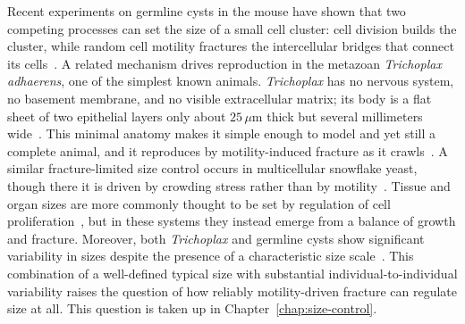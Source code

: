 Recent experiments on germline cysts in the mouse have shown that two competing processes can set the size of a small cell cluster: cell division builds the cluster, while random cell motility fractures the intercellular bridges that connect its cells~\cite{levy2024tug}.
A related mechanism drives reproduction in the metazoan \textit{Trichoplax adhaerens}, one of the simplest known animals.
\textit{Trichoplax} has no nervous system, no basement membrane, and no visible extracellular matrix; its body is a flat sheet of two epithelial layers only about $25\,\mu\mathrm{m}$ thick but several millimeters wide~\cite{prakash2021motility, ueda1999dynamic, smith2019coherent}.
This minimal anatomy makes it simple enough to model and yet still a complete animal, and it reproduces by motility-induced fracture as it crawls~\cite{prakash2021motility}.
A similar fracture-limited size control occurs in multicellular snowflake yeast, though there it is driven by crowding stress rather than by motility~\cite{jacobeen2018cellular}.
Tissue and organ sizes are more commonly thought to be set by regulation of cell proliferation~\cite{lecuit2007orchestrating}, but in these systems they instead emerge from a balance of growth and fracture.
Moreover, both \textit{Trichoplax} and germline cysts show significant variability in sizes despite the presence of a characteristic size scale~\cite{prakash2021motility, levy2024tug, ikami2023branched, lei2013mouse}.
This combination of a well-defined typical size with substantial individual-to-individual variability raises the question of how reliably motility-driven fracture can regulate size at all.
This question is taken up in Chapter~\ref{chap:size-control}.

